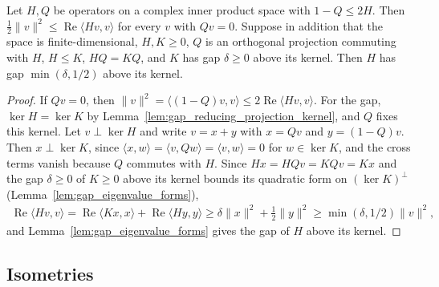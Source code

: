 \begin{theorem}
    \label{thm:gap_reducing_projection}
    \leanok
    Let $H,Q$ be operators on a complex inner product space with $1-Q\le2H$. Then
    $\tfrac12\lVert v\rVert^2\le\operatorname{Re}\langle Hv,v\rangle$ for every $v$ with
    $Qv=0$. Suppose in addition that the space is finite-dimensional, $H,K\ge0$, $Q$ is an
    orthogonal projection commuting with $H$, $H\le K$, $HQ=KQ$, and $K$ has gap
    $\delta\ge0$ above its kernel. Then $H$ has gap $\min(\delta,1/2)$ above its kernel.
\end{theorem}
\begin{proof}\leanok
    If $Qv=0$, then $\lVert v\rVert^2=\langle(1-Q)v,v\rangle\le2\operatorname{Re}\langle
        Hv,v\rangle$. For the gap, $\ker H=\ker K$ by
    Lemma~\ref{lem:gap_reducing_projection_kernel}, and $Q$ fixes this kernel. Let
    $v\perp\ker H$ and write $v=x+y$ with $x=Qv$ and $y=(1-Q)v$. Then $x\perp\ker K$,
    since $\langle x,w\rangle=\langle v,Qw\rangle=\langle v,w\rangle=0$ for
    $w\in\ker K$, and the cross terms vanish because $Q$ commutes with $H$. Since
    $Hx=HQv=KQv=Kx$ and the gap $\delta\ge0$ of $K\ge0$ above its kernel bounds its
    quadratic form on $(\ker K)^\perp$ (Lemma~\ref{lem:gap_eigenvalue_forms}),
    \begin{align*}
        \operatorname{Re}\langle Hv,v\rangle
        =\operatorname{Re}\langle Kx,x\rangle+\operatorname{Re}\langle Hy,y\rangle
        \ge\delta\lVert x\rVert^2+\tfrac12\lVert y\rVert^2
        \ge\min(\delta,1/2)\lVert v\rVert^2,
    \end{align*}
    and Lemma~\ref{lem:gap_eigenvalue_forms} gives the gap of $H$ above its kernel.
\end{proof}

\subsection{Isometries}
\label{sec:martingale_gaps_isometries}

